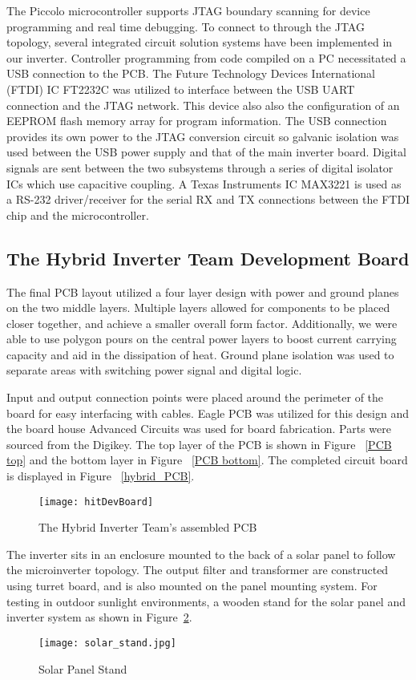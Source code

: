 The Piccolo microcontroller supports JTAG boundary scanning for device programming and real time debugging. To connect to through the JTAG topology, several integrated circuit solution systems have been implemented in our inverter. Controller programming from code compiled on a PC necessitated a USB connection to the PCB. The Future Technology Devices International (FTDI) IC FT2232C was utilized to interface between the USB UART connection and the JTAG network. This device also also the configuration of an EEPROM flash memory array for program information. The USB connection provides its own power to the JTAG conversion circuit so galvanic isolation was used between the USB power supply and that of the main inverter board. Digital signals are sent between the two subsystems through a series of digital isolator ICs which use capacitive coupling. A Texas Instruments IC MAX3221 is used as a RS-232 driver/receiver for the serial RX and TX connections between the FTDI chip and the microcontroller.  



\subsection{The Hybrid Inverter Team Development Board}
The final PCB layout utilized a four layer design with power and ground planes on the two middle layers. Multiple layers allowed for components to be placed closer together, and achieve a smaller overall form factor. Additionally, we were able to use polygon pours on the central power layers to boost current carrying capacity and aid in the dissipation of heat. Ground plane isolation was used to separate areas with switching power signal and digital logic.

Input and output connection points were placed around the perimeter of the board for easy interfacing with cables. Eagle PCB was utilized for this design and the board house Advanced Circuits was used for board fabrication. Parts were sourced from the Digikey. The top layer of the PCB is shown in Figure ~\ref{PCB top} and the bottom layer in Figure ~\ref{PCB bottom}. The completed circuit board is displayed in Figure ~\ref{hybrid_PCB}. 

\begin{figure}
\centering
\texttt{[image: hitDevBoard]}
\caption{The Hybrid Inverter Team's assembled PCB}
\label{The Hybrid Inverter Team's assembled PCB}
\end{figure}


The inverter sits in an enclosure mounted to the back of a solar panel to follow the microinverter topology. The output filter and transformer are constructed using turret board, and is also mounted on the panel mounting system. For testing in outdoor sunlight environments, a wooden stand for the solar panel and inverter system as shown in Figure~\ref{solar stand}.

\begin{figure}
\centering
\texttt{[image: solar\_stand.jpg]}
\caption{Solar Panel Stand}
\label{solar stand}
\end{figure}






